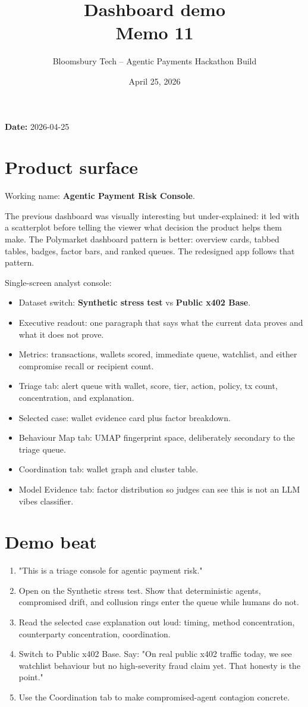 \documentclass[11pt]{article}
\title{\textbf{Dashboard demo}\\
\large Memo 11}
\author{Bloomsbury Tech -- Agentic Payments Hackathon Build}
\date{April 25, 2026}
\begin{document}
\maketitle

\textbf{Date:} 2026-04-25

\section{Product surface}
Working name: \textbf{Agentic Payment Risk Console}.

The previous dashboard was visually interesting but under-explained: it led with a scatterplot before telling the viewer what decision the product helps them make. The Polymarket dashboard pattern is better: overview cards, tabbed tables, badges, factor bars, and ranked queues. The redesigned app follows that pattern.

Single-screen analyst console:

\begin{itemize}
  \item Dataset switch: \textbf{Synthetic stress test} vs \textbf{Public x402 Base}.
  \item Executive readout: one paragraph that says what the current data proves and what it does not prove.
  \item Metrics: transactions, wallets scored, immediate queue, watchlist, and either compromise recall or recipient count.
  \item Triage tab: alert queue with wallet, score, tier, action, policy, tx count, concentration, and explanation.
  \item Selected case: wallet evidence card plus factor breakdown.
  \item Behaviour Map tab: UMAP fingerprint space, deliberately secondary to the triage queue.
  \item Coordination tab: wallet graph and cluster table.
  \item Model Evidence tab: factor distribution so judges can see this is not an LLM vibes classifier.
\end{itemize}
\section{Demo beat}
\begin{enumerate}
  \item "This is a triage console for agentic payment risk."
  \item Open on the Synthetic stress test. Show that deterministic agents, compromised drift, and collusion rings enter the queue while humans do not.
  \item Read the selected case explanation out loud: timing, method concentration, counterparty concentration, coordination.
  \item Switch to Public x402 Base. Say: "On real public x402 traffic today, we see watchlist behaviour but no high-severity fraud claim yet. That honesty is the point."
  \item Use the Coordination tab to make compromised-agent contagion concrete.
\end{enumerate}
\end{document}
